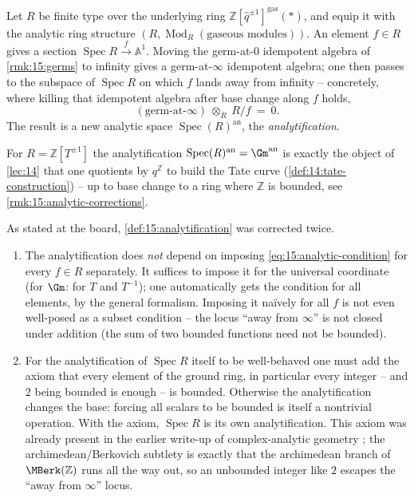 \begin{definition}
\label{def:15:analytification}
Let $R$ be finite type over the underlying ring
$\mathbb{Z}[\widehat q^{\pm1}]^{\mathrm{gas}}(\ast)$, and equip it with the analytic
ring structure $(R, \operatorname{Mod}_R(\text{gaseous modules}))$. An element $f\in
R$ gives a section $\operatorname{Spec} R \xrightarrow{f} \mathbb{A}^1$. Moving the
germ-at-$0$ idempotent algebra of \cref{rmk:15:germs} to infinity gives a germ-at-$\infty$
idempotent algebra; one then passes to the subspace of $\operatorname{Spec} R$ on
which $f$ lands away from infinity -- concretely, where killing that idempotent
algebra after base change along $f$ holds,
\begin{equation}
\label{eq:15:analytic-condition}
(\text{germ-at-}\infty)\ \otimes_{R}\ R/f\ =\ 0 .
\end{equation}
The result is a new analytic space $\operatorname{Spec}(R)^{\mathrm{an}}$, the
\emph{analytification}.
\end{definition}

\begin{example}[Analytic $\Gm$]
\label{ex:15:gm-an}
For $R = \mathbb{Z}[T^{\pm1}]$ the analytification $\operatorname{Spec}(R)^{\mathrm{an}}
= \Gm^{\mathrm{an}}$ is exactly the object of \cref{lec:14} that one quotients by
$q^{\mathbb{Z}}$ to build the Tate curve (\cref{def:14:tate-construction}) -- up to
base change to a ring where $\mathbb{Z}$ is bounded, see \cref{rmk:15:analytic-corrections}.
\end{example}

\begin{remark}
\label{rmk:15:analytic-corrections}
As stated at the board, \cref{def:15:analytification} was corrected twice.
\begin{enumerate}
\item The analytification does \emph{not} depend on imposing
\eqref{eq:15:analytic-condition} for every $f\in R$ separately. It suffices to impose
it for the universal coordinate (for $\Gm$: for $T$ and $T^{-1}$); one automatically
gets the condition for all elements, by the general formalism. Imposing it na\"ively
for all $f$ is not even well-posed as a subset condition -- the locus ``away from
$\infty$'' is not closed under addition (the sum of two bounded functions need not be
bounded).
\item For the analytification of $\operatorname{Spec} R$ itself to be well-behaved one
must add the axiom that every element of the ground ring, in particular every integer
-- and $2$ being bounded is enough -- is bounded. Otherwise the analytification
changes the base: forcing all scalars to be bounded is itself a nontrivial operation.
With the axiom, $\operatorname{Spec} R$ is its own analytification. This axiom was
already present in the earlier write-up of complex-analytic geometry
\cite{clausen2020analytic}; the archimedean/Berkovich subtlety is exactly that the
archimedean branch of $\MBerk(\mathbb{Z})$ runs all the way out, so an unbounded
integer like $2$ escapes the ``away from $\infty$'' locus.
\end{enumerate}
\end{remark}

